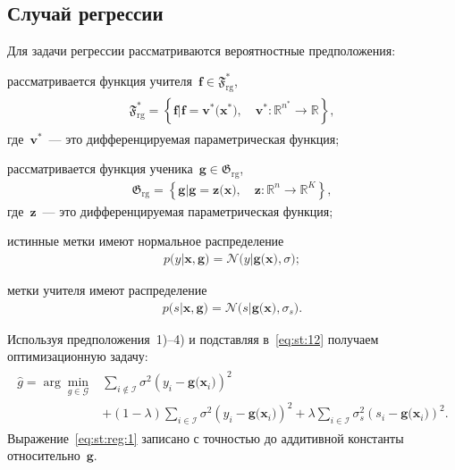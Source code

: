 \documentclass[12pt]{a&t}
\begin{document}
\subsection{Случай регрессии}
Для задачи регрессии рассматриваются вероятностные предположения:
\begin{enumlist}
	\item рассматривается функция учителя~$\mathbf{f}\in\mathfrak{F}_{\text{rg}}^{*}$,
	\begin{gather}
	\label{eq:F:set:priv}
	\begin{aligned}
	\mathfrak{F}_{\text{rg}}^* = \left\{\mathbf{f}| \mathbf{f} = \mathbf{v}^*\bigr(\mathbf{x}^*\bigr), \quad \mathbf{v}^*: \mathbb{R}^{n^*} \to \mathbb{R} \right\},
	\end{aligned}
	\end{gather}
	где~$\mathbf{v}^*$~--- это дифференцируемая параметрическая функция;
	\item рассматривается функция ученика~$\mathbf{g}\in\mathfrak{G}_{\text{rg}}$,
\begin{gather}
\label{eq:G:set:rg}
\mathfrak{G}_{\text{rg}} = \left\{\mathbf{g}| \mathbf{g} = \mathbf{z}\bigr(\mathbf{x}\bigr), \quad \mathbf{z}: \mathbb{R}^n \to \mathbb{R}^K \right\},
\end{gather}
где~$\mathbf{z}$~--- это дифференцируемая параметрическая функция;
	\item истинные метки имеют нормальное распределение
	\begin{gather}
		p\bigr(y|\mathbf{x}, \mathbf{g}\bigr) = \mathcal{N}\bigr(y|\mathbf{g}\bigr(\mathbf{x}\bigr), \sigma\bigr);
	\end{gather}
	\item метки учителя имеют распределение
	\begin{gather}
		p\bigr(s| \mathbf{x}, \mathbf{g}\bigr) = \mathcal{N}\bigr(s|\mathbf{g}\bigr(\mathbf{x}\bigr), \sigma_s\bigr).
	\end{gather}
\end{enumlist}

Используя предположения~1)--4) и подставляя в~\eqref{eq:st:12} получаем оптимизационную задачу:
\begin{gather}
\label{eq:st:reg:1}
\begin{aligned}
\hat{g} = \arg\min_{g\in \mathcal{G}} & \sum_{i\not\in \mathcal{I}}\sigma^2\left(y_i-\mathbf{g}\bigr(\mathbf{x}_i\bigr)\right)^2 \\
&+ \left(1-\lambda\right)\sum_{i\in \mathcal{I}}\sigma^2\left(y_i-\mathbf{g}\bigr(\mathbf{x}_i\bigr)\right)^2 + \lambda\sum_{i\in \mathcal{I}}\sigma_s^2\left(s_i-\mathbf{g}\bigr(\mathbf{x}_i\bigr)\right)^2.
\end{aligned}
\end{gather}
Выражение~\eqref{eq:st:reg:1} записано с точностью до аддитивной константы относительно~$\mathbf{g}$. 
\end{document}
